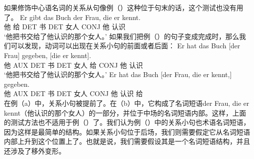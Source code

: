 \noindent
如果修饰中心语名词的关系从句像例（）这种位于句末的话，这个测试也没有用了。
\ea
\gll Er gibt das Buch der Frau, die er kennt.\\
      他 给 DET 书 DET 女人 CONJ 他 认识\\
\glt `他把书交给了他认识的那个女人。'
\z
如果我们把例（）的句子变成完成时，那么我们可以发现，动词可以出现在关系小句的前面或者后面：
\eal
\ex 
\gll Er hat das Buch [der Frau] gegeben, [die er kennt].\\
     他 AUX DET 书 \spacebr{}DET 女人 给 \spacebr{}CONJ 他 认识\\
\glt `他把书交给了他认识的那个女人。'
\ex 
\gll Er hat das Buch [der Frau, die er kennt,] gegeben.\\
	 他 AUX DET 书 \spacebr{}DET 女人 CONJ 他 认识 给\\
\zl
在例（a）中，关系小句被提前了。在（b）中，它构成了名词短语der Frau, die er kennt（他认识的那个女人）的一部分，并位于中场的名词短语内部。这样，上面的测试方法也不适用于例（）了。我们认为例（）中的关系小句也术语名词短语，因为这样是最简单的结构。如果关系小句位于后场，我们则需要假定它从名词短语内部上升到这个位置上了。也就是说，我们需要假设其是一个名词短语结构，并且还涉及了移外变形。
%

